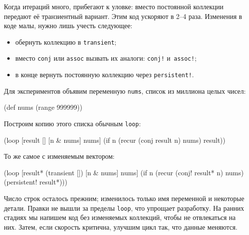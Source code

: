 Когда итераций много, прибегают к уловке: вместо постоянной коллекции передают
её транзиентный вариант. Этим код ускоряют в 2--4 раза. Изменения в коде малы,
нужно лишь учесть следующее:

\begin{itemize}

\item
  обернуть коллекцию в \verb|transient|;

\item
  вместо \verb|conj| или \verb|assoc| вызвать их аналоги: \verb|conj!|
  и~\verb|assoc!|;

\item
  в конце вернуть постоянную коллекцию через \verb|persistent!|.

\end{itemize}

Для экспериментов объявим переменную \verb|nums|, список из миллиона целых
чисел:

\begin{english}
  \begin{clojure}
(def nums (range 999999))
  \end{clojure}
\end{english}


\noindent
Построим копию этого списка обычным \verb|loop|:

\begin{english}
  \begin{clojure}
(loop [result []
       [n & nums] nums]
  (if n
    (recur (conj result n) nums)
    result))
  \end{clojure}
\end{english}

\noindent
То же самое с изменяемым вектором:

\begin{english}
  \begin{clojure}
(loop [result* (transient [])
       [n & nums] nums]
  (if n
    (recur (conj! result* n) nums)
    (persistent! result*)))
  \end{clojure}
\end{english}

Число строк осталось прежним; изменилось только имя переменной и некоторые
детали. Правки не вышли за пределы \verb|loop|, что упрощает разработку. На
ранних стадиях мы напишем код без изменяемых коллекций, чтобы не отвлекаться на
них. Затем, если скорость критична, улучшим цикл так, что данные меняются.


